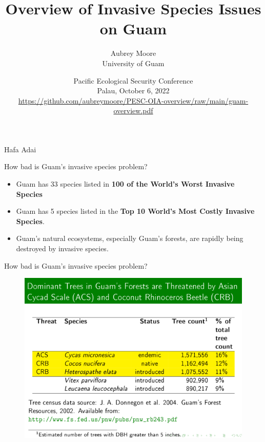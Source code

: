 \documentclass[]{beamer}
\title[Invasive Species Issues on Guam]{Overview of Invasive Species Issues on Guam}
\author[]{
	Aubrey Moore\\
	\bigskip 
	\tiny{University of Guam}
}
\date[]{Pacific Ecological Security Conference\\Palau, October 6, 2022\\ \tiny\url{https://github.com/aubreymoore/PESC-OIA-overview/raw/main/guam-overview.pdf}}
\begin{document}
	
    \maketitle

\begin{frame}{Hafa Adai}
\end{frame}

\begin{frame}{How bad is Guam's invasive species problem?}
	\begin{itemize}
		\item Guam has 33 species listed in \textbf{100 of the World's Worst Invasive Species}
		\item Guam has 5 species listed in the \textbf{Top 10 World's Most Costly Invasive Species}.
		\item Guam's natural ecosystems, especially Guam's forests, are rapidly being destroyed by invasive species.
	\end{itemize}	
\end{frame}

\begin{frame}{How bad is Guam's invasive species problem?}
\begin{figure}
	\centering
	\includegraphics[width=1\linewidth]{images/dominant_trees}
	\caption{}
	\label{fig:dominanttrees}
\end{figure}
\end{frame}
\end{document}
